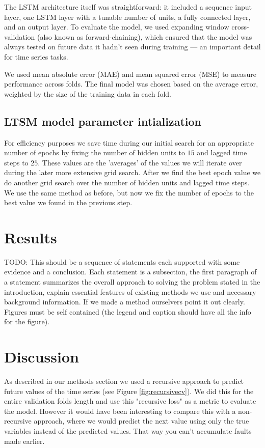 \documentclass[conference]{IEEEtran}
\begin{document}
The LSTM architecture itself was straightforward: it included a sequence input layer, one LSTM layer with 
a tunable number of units, a fully connected layer, and an output layer. To evaluate the model, we used 
expanding window cross-validation (also known as forward-chaining), which ensured that the model was 
always tested on future data it hadn’t seen during training — an important detail for time series tasks.

We used mean absolute error (MAE) and mean squared error (MSE) to measure performance across folds. The 
final model was chosen based on the average error, weighted by the size of the training data in each fold.

\subsection{LTSM model parameter intialization}
For efficiency purposes we save time during our initial search for an appropriate number of epochs by 
fixing the number of hidden units to $15$ and lagged time steps to $25$. These values are the 'averages'
of the values we will iterate over during the later more extensive grid search. 
After we find the best epoch value we do another grid search over the number of hidden units and lagged
time steps. We use the same method as before, but now we fix the number of epochs to the best value
we found in the previous step. 

\section{Results}
TODO: This should be a sequence of statements each supported with some evidence and a conclusion.
Each statement is a subsection, the first paragraph of a statement summarizes the overall approach 
to solving the problem stated in the introduction, explain essential features of existing methods
we use and necessary background information. If we made a method ourselvers point it out clearly. 
Figures must be self contained (the legend and caption should have all the info for the figure).

\section{Discussion}
As described in our methods section we used a recursive approach to predict future values of the time series (see Figure \ref{fig:recursivecv}).
We did this for the entire validation folds length and use this "recursive loss" as a metric to evaluate the model. 
However it would have been interesting to compare this with a non-recursive approach, where we would predict the next 
value using only the true variables instead of the predicted values. That way you can't accumulate faults
made earlier.
\end{document}
